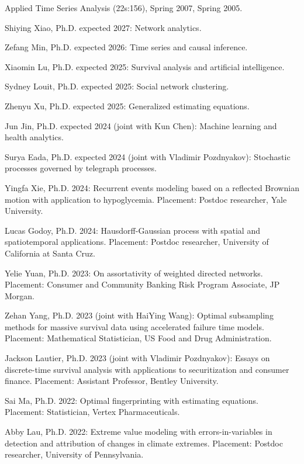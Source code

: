 \documentclass[Statistics]{vita}
\begin{document}
\begin{vita}
\begin{TeachingExperience}
\begin{UIowa}
    \item Applied Time Series Analysis (22s:156), Spring 2007, Spring 2005.
    \end{UIowa}
  \end{TeachingExperience}
  \begin{Students}
    \begin{Ph.D.}
    \item Shiying Xiao, Ph.D. expected 2027: Network analytics.
    \item Zefang Min, Ph.D. expected 2026: Time series and causal inference.
    \item Xiaomin Lu, Ph.D. expected 2025: Survival analysis and artificial intelligence.
    \item Sydney Louit, Ph.D. expected 2025: Social network clustering.
    \item Zhenyu Xu, Ph.D. expected 2025: Generalized estimating equations.
    \item Jun Jin, Ph.D. expected 2024 (joint with Kun Chen): Machine learning and health analytics.
    \item Surya Eada, Ph.D. expected 2024 (joint with Vladimir Pozdnyakov): Stochastic processes governed by telegraph processes.
    \item Yingfa Xie, Ph.D. 2024: Recurrent events modeling based on a reflected Brownian motion with application to hypoglycemia. Placement: Postdoc researcher, Yale University.
    \item Lucas Godoy, Ph.D. 2024: Hausdorff-Gaussian process with spatial and spatiotemporal applications. Placement: Postdoc researcher, University of California at Santa Cruz.
    \item Yelie Yuan, Ph.D. 2023: On assortativity of weighted directed networks. Placement: Consumer and Community Banking Risk Program Associate,  JP Morgan.
    \item Zehan Yang, Ph.D. 2023 (joint with HaiYing Wang): Optimal subsampling methods for massive survival data using accelerated failure time models. Placement: Mathematical Statistician, US Food and Drug Administration.
    \item Jackson Lautier, Ph.D. 2023 (joint with Vladimir Pozdnyakov): Essays on discrete-time survival analysis with applications to securitization and consumer finance. Placement: Assistant Professor, Bentley University. 
    \item Sai Ma, Ph.D. 2022: Optimal fingerprinting with estimating equations. Placement: Statistician, Vertex Pharmaceuticals.
    \item Abby Lau, Ph.D. 2022: Extreme value modeling with errors-in-variables in detection and attribution of changes in climate extremes. Placement: Postdoc researcher, University of Pennsylvania.

\end{Ph.D.}
\end{Students}
\end{vita}
\end{document}
